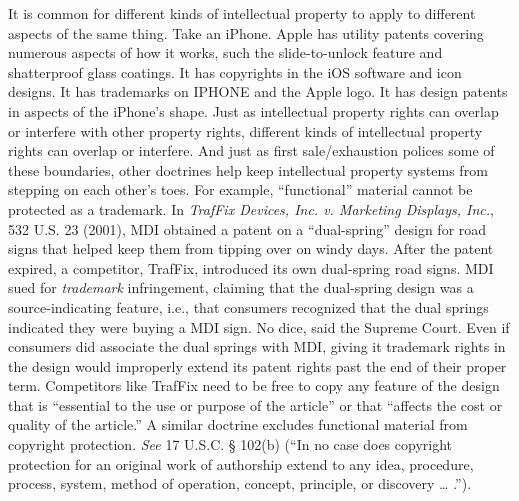 \item It is common for different kinds of intellectual property to apply to
different aspects of the same thing. Take an iPhone. Apple has utility patents
covering numerous aspects of how it works, such the slide-to-unlock feature and
shatterproof glass coatings. It has copyrights in the iOS software and icon
designs. It has trademarks on IPHONE and the Apple logo. It has design patents
in aspects of the iPhone's shape. Just as intellectual property rights can
overlap or interfere with other property rights, different kinds of
intellectual property rights can overlap or interfere. And just as first
sale/exhaustion polices some of these boundaries, other doctrines help keep
intellectual property systems from stepping on each other's toes. For example,
``functional'' material cannot be protected as a trademark. In \textit{TrafFix
Devices, Inc. v. Marketing Displays, Inc.}, 532 U.S. 23 (2001), MDI obtained a
patent on a ``dual-spring'' design for road signs that helped keep them from
tipping over on windy days. After the patent expired, a competitor, TrafFix,
introduced its own dual-spring road signs. MDI sued for \textit{trademark}
infringement, claiming that the dual-spring design was a source-indicating
feature, i.e., that consumers recognized that the dual springs indicated they
were buying a MDI sign. No dice, said the Supreme Court. Even if consumers did
associate the dual springs with MDI, giving it trademark rights in the design
would improperly extend its patent rights past the end of their proper term.
Competitors like TrafFix need to be free to copy any feature of the design that
is ``essential to the use or purpose of the article'' or that ``affects the
cost or quality of the article.'' A similar doctrine excludes functional
material from copyright protection. \textit{See} 17 U.S.C. {\S} 102(b) (``In no
case does copyright protection for an original work of authorship extend to any
idea, procedure, process, system, method of operation, concept, principle, or
discovery {\dots} .'').

